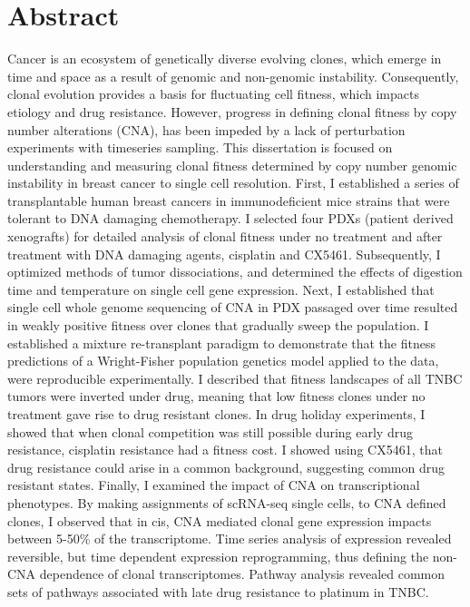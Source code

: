 
\chapter{Abstract}

Cancer is an ecosystem of genetically diverse evolving clones, which emerge in time and space as a result of genomic and non-genomic instability. Consequently, clonal evolution provides a basis for fluctuating cell fitness, which impacts etiology and drug resistance. However, progress in defining clonal fitness by copy number alterations (CNA), has been impeded by a lack of perturbation experiments with timeseries sampling. This dissertation is focused on understanding and measuring clonal fitness determined by copy number genomic instability in breast cancer to single cell resolution. First, I established a series of transplantable human breast cancers in immunodeficient mice strains that were tolerant to DNA damaging chemotherapy. I selected four PDXs (patient derived xenografts) for detailed analysis of clonal fitness under no treatment and after treatment with DNA damaging agents, cisplatin and CX5461. Subsequently, I optimized methods of tumor dissociations, and determined the effects of digestion time and temperature on single cell gene expression. Next, I established that single cell whole genome sequencing of CNA in PDX passaged over time resulted in weakly positive fitness over clones that gradually sweep the population. I established a mixture re-transplant paradigm to demonstrate that the fitness predictions of a Wright-Fisher population genetics model applied to the data, were reproducible experimentally.  I described that fitness landscapes of all TNBC tumors were inverted under drug, meaning that low fitness clones under no treatment gave rise to drug resistant clones. In drug holiday experiments, I showed that when clonal competition was still possible during early drug resistance, cisplatin resistance had a fitness cost. I showed using CX5461, that drug resistance could arise in a common background, suggesting common drug resistant states. Finally, I examined the impact of CNA on transcriptional phenotypes. By making assignments of scRNA-seq single cells, to CNA defined clones, I observed that in cis, CNA mediated clonal gene expression impacts between 5-50\% of the transcriptome. Time series analysis of expression revealed reversible, but time dependent expression reprogramming, thus defining the non-CNA dependence of clonal transcriptomes. Pathway analysis revealed common sets of pathways associated with late drug resistance to platinum in TNBC.

